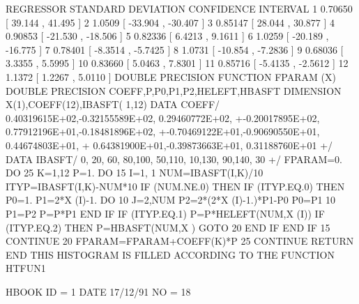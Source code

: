 \begin{Listing}
{ REGRESSOR  STANDARD DEVIATION     CONFIDENCE INTERVAL
     1          0.70650         [  39.144    ,  41.495    ]
     2           1.0509         [ -33.904    , -30.407    ]
     3          0.85147         [  28.044    ,  30.877    ]
     4          0.90853         [ -21.530    , -18.506    ]
     5          0.82336         [  6.4213    ,  9.1611    ]
     6           1.0259         [ -20.189    , -16.775    ]
     7          0.78401         [ -8.3514    , -5.7425    ]
     8           1.0731         [ -10.854    , -7.2836    ]
     9          0.68036         [  3.3355    ,  5.5995    ]
    10          0.83660         [  5.0463    ,  7.8301    ]
    11          0.85716         [ -5.4135    , -2.5612    ]
    12           1.1372         [  1.2267    ,  5.0110    ]
      DOUBLE PRECISION FUNCTION FPARAM (X)
      DOUBLE PRECISION COEFF,P,P0,P1,P2,HELEFT,HBASFT
      DIMENSION X(1),COEFF(12),IBASFT( 1,12)
      DATA COEFF/ 0.40319615E+02,-0.32155589E+02, 0.29460772E+02,
     +-0.20017895E+02, 0.77912196E+01,-0.18481896E+02,
     +-0.70469122E+01,-0.90690550E+01, 0.44674803E+01,
     + 0.64381900E+01,-0.39873663E+01, 0.31188760E+01
     +/
      DATA IBASFT/  0, 20, 60, 80,100, 50,110, 10,130, 90,140, 30
     +/
      FPARAM=0.
      DO 25 K=1,12
      P=1.
      DO 15 I=1, 1
      NUM=IBASFT(I,K)/10
      ITYP=IBASFT(I,K)-NUM*10
      IF (NUM.NE.0) THEN
      IF (ITYP.EQ.0) THEN
      P0=1.
      P1=2*X (I)-1.
      DO 10 J=2,NUM
      P2=2*(2*X (I)-1.)*P1-P0
      P0=P1
   10 P1=P2
      P=P*P1
      END IF
      IF (ITYP.EQ.1) P=P*HELEFT(NUM,X (I))
      IF (ITYP.EQ.2) THEN
      P=HBASFT(NUM,X )
      GOTO 20
      END IF
      END IF
   15 CONTINUE
   20 FPARAM=FPARAM+COEFF(K)*P
   25 CONTINUE
      RETURN
      END
}
\newpage
 THIS HISTOGRAM IS FILLED ACCORDING TO THE FUNCTION HTFUN1                       

 HBOOK     ID =         1                                        DATE  17/12/91              NO =  18
 

\end{Listing}
